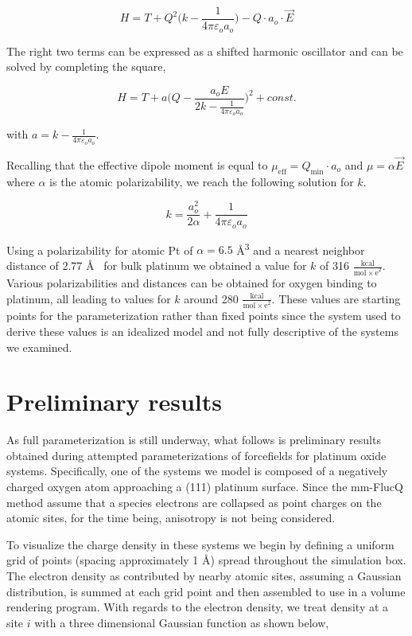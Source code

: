 \begin{equation*}
H = T + Q^2\bigg(k - \frac{1}{4 \pi\varepsilon_o a_o}\bigg) - Q\cdot a_o \cdot \vec{E}
\end{equation*}

The right two terms can be expressed as a shifted harmonic oscillator and can be solved by completing the square,

\begin{equation*}
H = T + a\bigg(Q - \frac{a_oE}{2k - \frac{1}{4\pi\varepsilon_o a_o}}\bigg)^2 + const.
\end{equation*}

with $a = k - \frac{1}{4\pi\varepsilon_o a_o}$.

Recalling that the effective dipole moment is equal to $\mu_{\text{eff}} =
Q_{\text{min}}\cdot a_o$ and $\mu = \alpha\vec{E}$ where $\alpha$ is the atomic
polarizability, we reach the following solution for $k$.

\begin{equation*}
k = \frac{a_o^2}{2\alpha} + \frac{1}{4\pi\varepsilon_o a_o}
\end{equation*}

Using a polarizability for atomic Pt of $\alpha = 6.5$ \AA\textsuperscript{3}
and a nearest neighbor distance of $2.77$ \AA~ for bulk platinum we obtained a
value for $k$ of 316 $\frac{\text{kcal}}{\mathrm{mol\times e}^2}$. Various
polarizabilities and distances can be obtained for oxygen binding to platinum,
all leading to values for $k$ around 280 $\frac{\text{kcal}}{\mathrm{mol\times
e}^2}$.  These values are starting points for the
parameterization rather than fixed points since the system used to derive
these values is an idealized model and not fully descriptive of the systems we
examined.

\section{Preliminary results}
As full parameterization is still underway, what follows is preliminary results
obtained during attempted parameterizations of forcefields for platinum oxide
systems. Specifically, one of the systems we model is composed of a negatively
charged oxygen atom approaching a (111) platinum surface. 
Since the mm-FlucQ method assume that a species electrons are collapsed
as point charges on the atomic sites, for the time being, anisotropy is not being considered. 

To visualize the charge density in these systems we begin by defining a uniform
grid of points (spacing approximately 1 \AA) spread throughout the simulation
box. The electron density as contributed by nearby atomic sites, assuming a
Gaussian distribution, is summed at each grid point and then assembled to use in
a volume rendering program. With regards to the electron
density, we treat density at a site $i$ with a three dimensional Gaussian
function as shown below,

